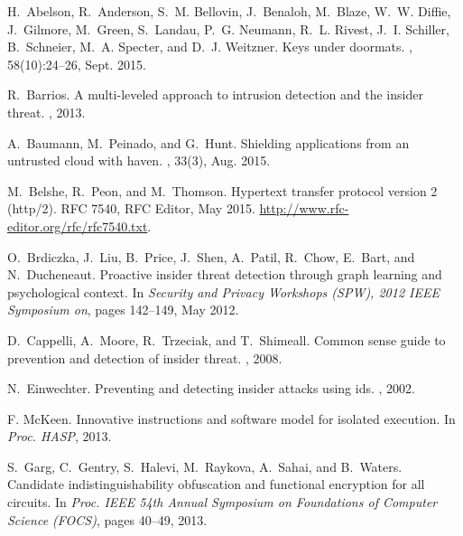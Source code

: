 \documentclass{sig-alternate-10pt}
\begin{document}
{\def\noopsort#1{} \def\No{\kern-.25em\lower.2ex\hbox{\char'27}}
  \def\no#1{\relax} \def\http#1{{\\{\small\tt
  http://www-litp.ibp.fr:80/{}#1}}}\def\noopsort#1{}
  \def\No{\kern-.25em\lower.2ex\hbox{\char'27}} \def\no#1{\relax}
  \def\http#1{{\\{\small\tt http://www-litp.ibp.fr:80/{}#1}}}
\begin{thebibliography}{10}

H.~Abelson, R.~Anderson, S.~M. Bellovin, J.~Benaloh, M.~Blaze, W.~W. Diffie,
  J.~Gilmore, M.~Green, S.~Landau, P.~G. Neumann, R.~L. Rivest, J.~I. Schiller,
  B.~Schneier, M.~A. Specter, and D.~J. Weitzner.
\newblock Keys under doormats.
, 58(10):24--26, Sept. 2015.

R.~Barrios.
\newblock A multi-leveled approach to intrusion detection and the insider
  threat.
, 2013.

A.~Baumann, M.~Peinado, and G.~Hunt.
\newblock Shielding applications from an untrusted cloud with haven.
, 33(3), Aug. 2015.

M.~Belshe, R.~Peon, and M.~Thomson.
\newblock Hypertext transfer protocol version 2 (http/2).
\newblock RFC 7540, RFC Editor, May 2015.
\newblock \url{http://www.rfc-editor.org/rfc/rfc7540.txt}.

O.~Brdiczka, J.~Liu, B.~Price, J.~Shen, A.~Patil, R.~Chow, E.~Bart, and
  N.~Ducheneaut.
\newblock Proactive insider threat detection through graph learning and
  psychological context.
\newblock In {\em Security and Privacy Workshops (SPW), 2012 IEEE Symposium
  on}, pages 142--149, May 2012.

D.~Cappelli, A.~Moore, R.~Trzeciak, and T.~Shimeall.
\newblock Common sense guide to prevention and detection of insider threat.
,
  2008.

N.~Einwechter.
\newblock Preventing and detecting insider attacks using ids.
, 2002.

{F. McKeen}.
\newblock Innovative instructions and software model for isolated execution.
\newblock In {\em Proc. HASP}, 2013.

S.~Garg, C.~Gentry, S.~Halevi, M.~Raykova, A.~Sahai, and B.~Waters.
\newblock Candidate indistinguishability obfuscation and functional encryption
  for all circuits.
\newblock In {\em Proc. IEEE 54th Annual Symposium on Foundations of Computer
  Science (FOCS)}, pages 40--49, 2013.


\end{thebibliography}}
\end{document}
